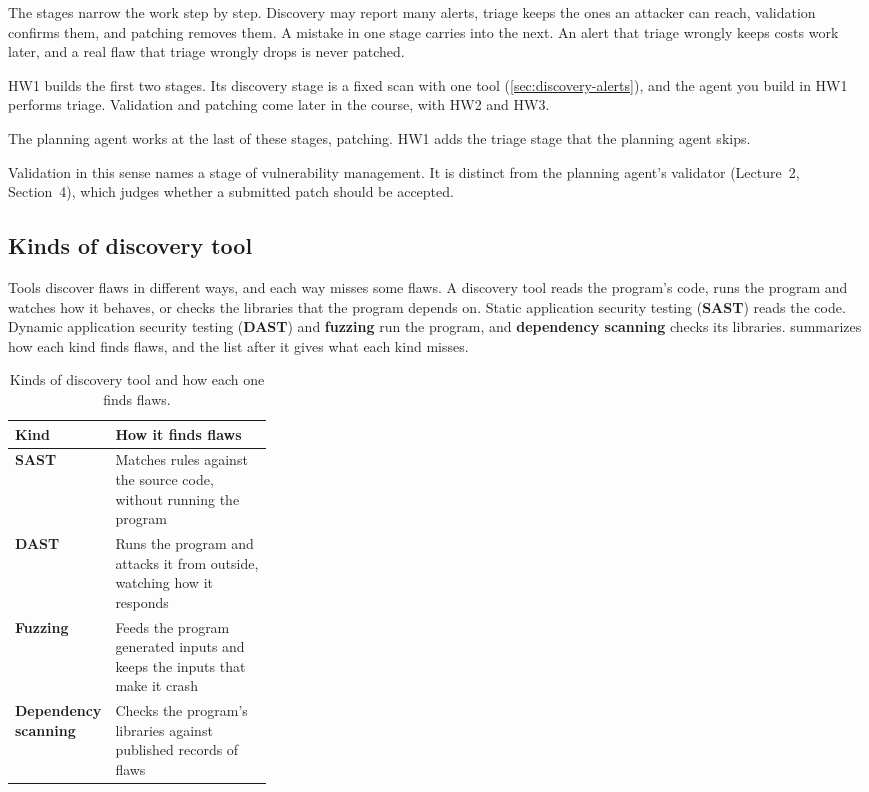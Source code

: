 The stages narrow the work step by step. Discovery may report many alerts, triage keeps the ones an
attacker can reach, validation confirms them, and patching removes them. A mistake in one stage
carries into the next. An alert that triage wrongly keeps costs work later, and a real flaw that
triage wrongly drops is never patched.

HW1 builds the first two stages. Its discovery stage is a fixed scan with one tool
(\cref{sec:discovery-alerts}), and the agent you build in HW1 performs triage. Validation and
patching come later in the course, with HW2 and HW3.

The planning agent works at the last of these stages, patching. HW1 adds the triage stage that the
planning agent skips.

Validation in this sense names a stage of vulnerability management. It is distinct from the planning
agent's validator (Lecture~2, Section~4), which judges whether a submitted patch should be accepted.

\subsection{Kinds of discovery tool}
\label{sec:discovery-tools}

Tools discover flaws in different ways, and each way misses some flaws. A discovery tool reads the
program's code, runs the program and watches how it behaves, or checks the libraries that the
program depends on. Static application security testing (\textbf{SAST}) reads the code. Dynamic
application security testing (\textbf{DAST}) and \textbf{fuzzing} run the program, and
\textbf{dependency scanning} checks its libraries.  summarizes how each
kind finds flaws, and the list after it gives what each kind misses.

\begin{table}[htbp]
  \caption{Kinds of discovery tool and how each one finds flaws.}
  \label{tab:discovery-tools}
  \begin{adjustbox}{width=\linewidth}\begin{tabularx}{\linewidth}{L{0.3\linewidth}X}
    \toprule
    \textbf{Kind} & \textbf{How it finds flaws} \\
    \midrule
    \textbf{SAST} & Matches rules against the source code, without running the program \\
    \textbf{DAST} & Runs the program and attacks it from outside, watching how it responds \\
    \textbf{Fuzzing} & Feeds the program generated inputs and keeps the inputs that make it crash \\
    \textbf{Dependency scanning} & Checks the program's libraries against published records of flaws \\
    \bottomrule
  \end{tabularx}\end{adjustbox}
\end{table}

